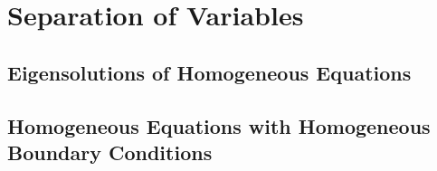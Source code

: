 \flushbottom




\chapter{Separation of Variables}


\section{Eigensolutions of Homogeneous Equations}




\section{Homogeneous Equations with Homogeneous Boundary Conditions}



